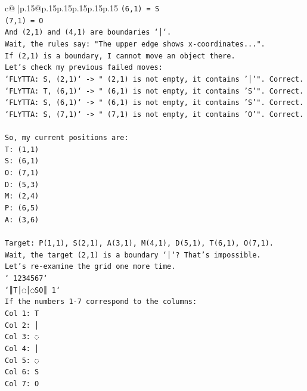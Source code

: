 \documentclass{article}
\begin{document}
{\begin{supertabular}{c@{$\;$}|p{.15\linewidth}@{}p{.15\linewidth}p{.15\linewidth}p{.15\linewidth}p{.15\linewidth}p{.15\linewidth}}
{{{\texttt{(6,1) = S} \\
\texttt{(7,1) = O} \\
\texttt{And (2,1) and (4,1) are boundaries `│`.} \\
\texttt{Wait, the rules say: "The upper edge shows x{-}coordinates...".} \\
\texttt{If (2,1) is a boundary, I cannot move an object there.} \\
\texttt{Let's check my previous failed moves:} \\
\texttt{`FLYTTA: S, (2,1)` {-}> " (2,1) is not empty, it contains '│'". Correct.} \\
\texttt{`FLYTTA: T, (6,1)` {-}> " (6,1) is not empty, it contains 'S'". Correct.} \\
\texttt{`FLYTTA: S, (6,1)` {-}> " (6,1) is not empty, it contains 'S'". Correct.} \\
\texttt{`FLYTTA: S, (7,1)` {-}> " (7,1) is not empty, it contains 'O'". Correct.} \\
\\ 
\texttt{So, my current positions are:} \\
\texttt{T: (1,1)} \\
\texttt{S: (6,1)} \\
\texttt{O: (7,1)} \\
\texttt{D: (5,3)} \\
\texttt{M: (2,4)} \\
\texttt{P: (6,5)} \\
\texttt{A: (3,6)} \\
\\ 
\texttt{Target: P(1,1), S(2,1), A(3,1), M(4,1), D(5,1), T(6,1), O(7,1).} \\
\texttt{Wait, the target (2,1) is a boundary `│`? That's impossible.} \\
\texttt{Let's re{-}examine the grid one more time.} \\
\texttt{` 1234567`} \\
\texttt{`║T│◌│◌SO║ 1`} \\
\texttt{If the numbers 1{-}7 correspond to the columns:} \\
\texttt{Col 1: T} \\
\texttt{Col 2: │} \\
\texttt{Col 3: ◌} \\
\texttt{Col 4: │} \\
\texttt{Col 5: ◌} \\
\texttt{Col 6: S} \\
\texttt{Col 7: O} \\
}}}
\end{supertabular}}
\end{document}
